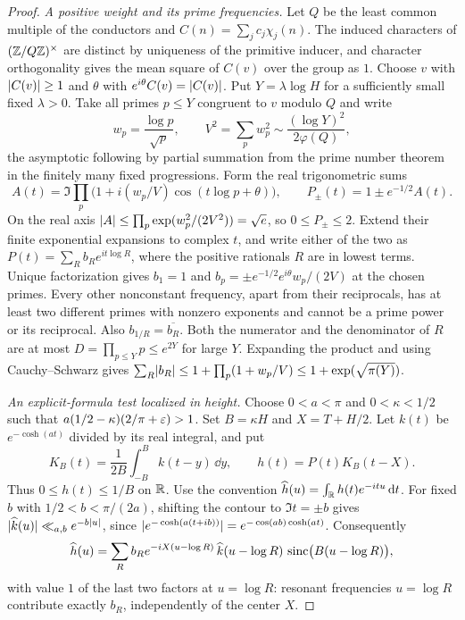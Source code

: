 \begin{proof}
\emph{A positive weight and its prime frequencies.} Let $Q$ be the least common multiple of
the conductors and $C(n)=\sum_jc_j\chi_j(n)$. The induced characters of $(\mathbb{Z}/Q\mathbb{Z})^\times$
are distinct by uniqueness of the primitive inducer, and character orthogonality gives the
mean square of $C(v)$ over the group as $1$. Choose $v$ with $\lvert C(v)\rvert\ge1$ and $\theta$
with $e^{i\theta}C(v)=\lvert C(v)\rvert$. Put $Y=\lambda\log H$ for a sufficiently small fixed
$\lambda>0$. Take all primes $p\le Y$ congruent to $v$ modulo $Q$ and write
\[
 w_p=\frac{\log p}{\sqrt p},\qquad V^2=\sum_pw_p^2\sim\frac{(\log Y)^2}{2\varphi(Q)},
\]
the asymptotic following by partial summation from the prime number theorem in the finitely
many fixed progressions. Form the real trigonometric sums
\[
 A(t)=\Im\prod_p\bigl(1+i(w_p/V)\cos(t\log p+\theta)\bigr),\qquad
 P_\pm(t)=1\pm e^{-1/2}A(t).
\]
On the real axis $\lvert A\rvert\le\prod_p\exp(w_p^2/(2V^2))=\sqrt e$, so $0\le P_\pm\le2$. Extend
their finite exponential expansions to complex $t$, and write either of the two as
$P(t)=\sum_Rb_Re^{it\log R}$, where the positive rationals $R$ are in lowest terms. Unique
factorization gives $b_1=1$ and $b_p=\pm e^{-1/2}e^{i\theta}w_p/(2V)$ at the chosen primes.
Every other nonconstant frequency, apart from their reciprocals, has at least two different
primes with nonzero exponents and cannot be a prime power or its reciprocal. Also
$b_{1/R}=\overline{b_R}$. Both the numerator and the denominator of $R$ are at most
$D=\prod_{p\le Y}p\le e^{2Y}$ for large $Y$. Expanding the product and using
Cauchy--Schwarz gives $\sum_R\lvert b_R\rvert\le1+\prod_p(1+w_p/V)\le1+\exp(\sqrt{\pi(Y)})$.

\emph{An explicit-formula test localized in height.} Choose $0<a<\pi$ and $0<\kappa<1/2$
such that $a(1/2-\kappa)(2/\pi+\varepsilon)>1$. Set $B=\kappa H$ and $X=T+H/2$. Let $k(t)$ be
$e^{-\cosh(at)}$ divided by its real integral, and put
\[
 K_B(t)=\frac1{2B}\int_{-B}^Bk(t-y)\,\dd y,\qquad h(t)=P(t)K_B(t-X).
\]
Thus $0\le h(t)\le1/B$ on $\mathbb{R}$. Use the convention
$\widehat h(u)=\int_{\mathbb{R}} h(t)e^{-itu}\,\mathrm{d} t$. For fixed $b$ with $1/2<b<\pi/(2a)$, shifting
the contour to $\Im t=\pm b$ gives $\lvert\widehat k(u)\rvert\ll_{a,b}e^{-b\lvert u\rvert}$, since
$\lvert e^{-\cosh(a(t+ib))}\rvert=e^{-\cos(ab)\cosh(at)}$. Consequently
\[
 \widehat h(u)=\sum_Rb_Re^{-iX(u-\log R)}\,\widehat k(u-\log R)\,
 \operatorname{sinc}\bigl(B(u-\log R)\bigr),
\]
with value $1$ of the last two factors at $u=\log R$: resonant frequencies $u=\log R$
contribute exactly $b_R$, independently of the center $X$.


\end{proof}
